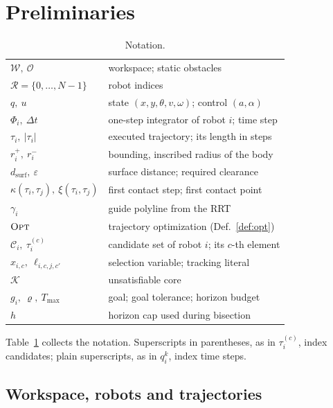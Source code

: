 \documentclass[conference]{IEEEtran}
\theoremstyle{plain}
\theoremstyle{definition}
\newcommand{\W}{\mathcal{W}}
\newcommand{\Obs}{\mathcal{O}}
\newcommand{\Rob}{\mathcal{R}}
\newcommand{\Cand}{\mathcal{C}}
\newcommand{\Core}{\mathcal{K}}
\newcommand{\clr}{\varepsilon}
\begin{document}
\section{Preliminaries}
\label{sec:prelim}

\begin{table}[t]
\caption{Notation.}
\label{tab:notation}
\centering
\small
\setlength{\tabcolsep}{3pt}
\begin{tabular}{@{}ll@{}}
\toprule
$\W,\ \Obs$ & workspace; static obstacles \\
$\Rob = \{0,\dots,N{-}1\}$ & robot indices \\
$q,\ u$ & state $(x,y,\theta,v,\omega)$; control $(a,\alpha)$ \\
$\Phi_i,\ \Delta t$ & one-step integrator of robot $i$; time step \\
$\tau_i,\ |\tau_i|$ & executed trajectory; its length in steps \\
$r^{+}_i,\ r^{-}_i$ & bounding, inscribed radius of the body \\
$d_{\text{surf}},\ \clr$ & surface distance; required clearance \\
$\kappa(\tau_i,\tau_j),\ \xi(\tau_i,\tau_j)$ & first contact step; first contact point \\
$\gamma_i$ & guide polyline from the RRT \\
$\textsc{Opt}$ & trajectory optimization (Def.~\ref{def:opt}) \\
$\Cand_i,\ \tau_i^{(c)}$ & candidate set of robot $i$; its $c$-th element \\
$x_{i,c},\ \ell_{i,c,j,c'}$ & selection variable; tracking literal \\
$\Core$ & unsatisfiable core \\
$g_i,\ \varrho,\ T_{\max}$ & goal; goal tolerance; horizon budget \\
$h$ & horizon cap used during bisection \\
\bottomrule
\end{tabular}
\end{table}

Table~\ref{tab:notation} collects the notation. Superscripts in parentheses, as in
$\tau_i^{(c)}$, index candidates; plain superscripts, as in $q_i^k$, index time steps.

\subsection{Workspace, robots and trajectories}
\label{sec:prelim-world}
\end{document}
